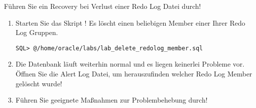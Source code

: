     \item Führen Sie ein Recovery bei Verlust einer Redo Log Datei durch!
      \begin{enumerate}
        \item Starten Sie das Skript ! Es löscht einen beliebigen Member einer Ihrer Redo Log Gruppen.
          \begin{lstlisting}[language=terminal]
SQL> @/home/oracle/labs/lab_delete_redolog_member.sql
          \end{lstlisting}
        \item Die Datenbank läuft weiterhin normal und es liegen keinerlei Probleme vor. Öffnen Sie die Alert Log Datei, um herauszufinden welcher Redo Log Member gelöscht wurde!
        \item Führen Sie geeignete Maßnahmen zur Problembehebung durch!
      \end{enumerate}
